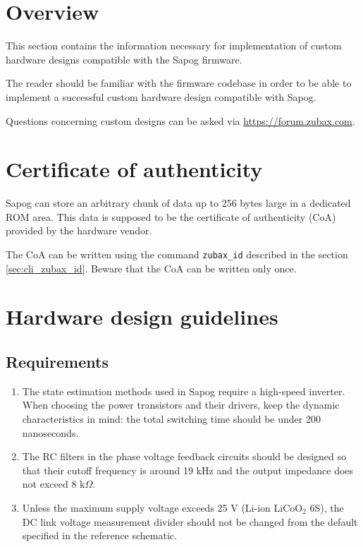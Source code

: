\documentclass{zubaxdoc}
\begin{document}
\section{Overview}

This section contains the information necessary for implementation of custom hardware designs compatible with the
Sapog firmware.

The reader should be familiar with the firmware codebase in order to be able to implement a successful
custom hardware design compatible with Sapog.

Questions concerning custom designs can be asked via \url{https://forum.zubax.com}.

\section{Certificate of authenticity}

Sapog can store an arbitrary chunk of data up to 256 bytes large in a dedicated ROM area.
This data is supposed to be the certificate of authenticity (CoA) provided by the hardware vendor.

The CoA can be written using the command \verb|zubax_id| described in the section
\ref{sec:cli_zubax_id}.
Beware that the CoA can be written only once.

\section{Hardware design guidelines}

\subsection{Requirements}

\begin{enumerate}
    \item The state estimation methods used in Sapog require a high-speed inverter.
    When choosing the power transistors and their drivers, keep the dynamic characteristics in mind:
    the total switching time should be under 200 nanoseconds.

    \item The RC filters in the phase voltage feedback circuits should be designed so that their cutoff frequency
    is around 19 kHz and the output impedance does not exceed 8 $\text{k}\Omega$.

    \item Unless the maximum supply voltage exceeds 25 V (Li-ion $\text{LiCoO}_2$ 6S),
    the DC link voltage measurement divider should not be changed from the default specified in
    the reference schematic.
\end{enumerate}
\end{document}
